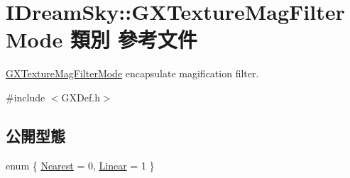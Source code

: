 \hypertarget{class_i_dream_sky_1_1_g_x_texture_mag_filter_mode}{}\section{I\+Dream\+Sky\+:\+:G\+X\+Texture\+Mag\+Filter\+Mode 類別 參考文件}
\label{class_i_dream_sky_1_1_g_x_texture_mag_filter_mode}


\hyperlink{class_i_dream_sky_1_1_g_x_texture_mag_filter_mode}{G\+X\+Texture\+Mag\+Filter\+Mode} encapsulate magification filter.  




{\ttfamily \#include $<$G\+X\+Def.\+h$>$}

\subsection*{公開型態}
\begin{DoxyCompactItemize}
\item 
enum \{ \hyperlink{class_i_dream_sky_1_1_g_x_texture_mag_filter_mode_aa9223abd2c36cde2aac7dd20063bfe0aa2eccce18269cdc2ee8ce33013f1b7da7}{Nearest} = 0, 
\hyperlink{class_i_dream_sky_1_1_g_x_texture_mag_filter_mode_aa9223abd2c36cde2aac7dd20063bfe0aa9fd18a38929fbcfeb4758be4cb73938c}{Linear} = 1
 \}
\end{DoxyCompactItemize}

